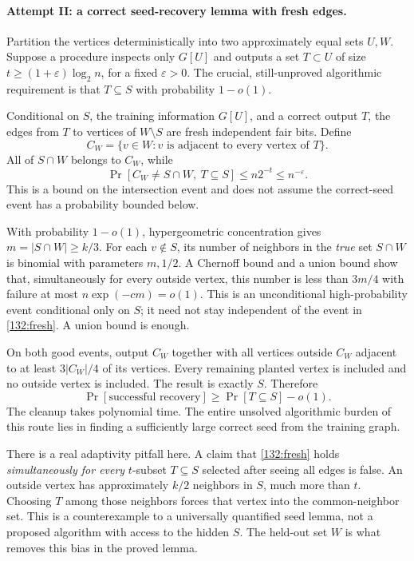 \documentclass[11pt,a4paper]{article}
\numberwithin{equation}{section}
\begin{document}
\paragraph{Attempt II: a correct seed-recovery lemma with fresh edges.}
Partition the vertices deterministically into two approximately equal
sets $U,W$.  Suppose a procedure inspects only $G[U]$ and outputs a
set $T\subset U$ of size
$t\geq(1+\varepsilon)\log_2 n$, for a fixed $\varepsilon>0$.
The crucial, still-unproved algorithmic requirement is that
$T\subseteq S$ with probability $1-o(1)$.

Conditional on $S$, the training information $G[U]$, and a correct
output $T$, the edges from $T$ to vertices of $W\setminus S$ are
fresh independent fair bits.  Define
\[
 C_W=\{v\in W:v\text{ is adjacent to every vertex of }T\}.
\]
All of $S\cap W$ belongs to $C_W$, while
\begin{equation}\label{132:fresh}
 \Pr[C_W\ne S\cap W,\ T\subseteq S]
 \leq n2^{-t}\leq n^{-\varepsilon}.
\end{equation}
This is a bound on the intersection event and does not assume the
correct-seed event has a probability bounded below.

With probability $1-o(1)$, hypergeometric concentration gives
$m=|S\cap W|\geq k/3$.  For each $v\notin S$, its number of neighbors
in the \emph{true} set $S\cap W$ is binomial with parameters $m,1/2$.
A Chernoff bound and a union bound show that, simultaneously for every
outside vertex, this number is less than $3m/4$ with failure at most
$n\exp(-c m)=o(1)$.  This is an unconditional high-probability event
conditional only on $S$; it need not stay independent of the event in
\eqref{132:fresh}.  A union bound is enough.

On both good events, output $C_W$ together with all vertices outside
$C_W$ adjacent to at least $3|C_W|/4$ of its vertices.  Every remaining
planted vertex is included and no outside vertex is included.  The
result is exactly $S$.  Therefore
\begin{equation}\label{132:seedrecovery}
 \Pr[\text{successful recovery}]
 \geq\Pr[T\subseteq S]-o(1).
\end{equation}
The cleanup takes polynomial time.  The entire unsolved algorithmic
burden of this route lies in finding a sufficiently large correct
seed from the training graph.

There is a real adaptivity pitfall here.  A claim that
\eqref{132:fresh} holds \emph{simultaneously for every}
$t$-subset $T\subseteq S$ selected after seeing all edges is false.
An outside vertex has approximately $k/2$ neighbors in $S$, much more
than $t$.  Choosing $T$ among those neighbors forces that vertex into
the common-neighbor set.  This is a counterexample to a universally
quantified seed lemma, not a proposed algorithm with access to the
hidden $S$.  The held-out set $W$ is what removes this bias in the
proved lemma.
\end{document}
